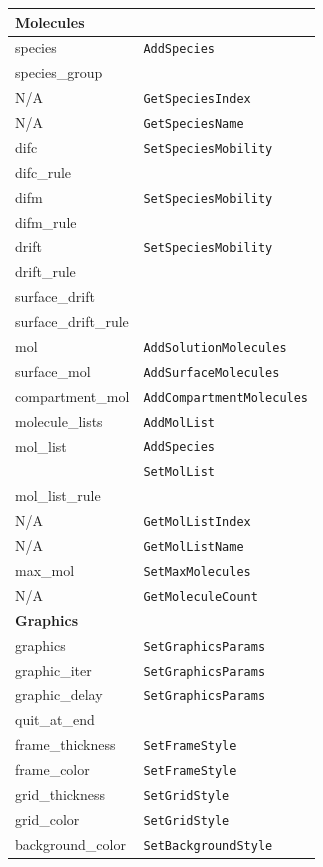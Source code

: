 \documentclass {book}
\newcommand {\ttt} {\texttt}
\begin{document}
\begin{longtable}[c]{ll}
\hline
\multicolumn{2}{l}{\hspace{0.3in}\textbf{Molecules}}\\
\hline
species & \ttt{AddSpecies}\\
species\_group\\ %
N/A & \ttt{GetSpeciesIndex}\\
N/A & \ttt{GetSpeciesName}\\
difc & \ttt{SetSpeciesMobility}\\
difc\_rule \\ %
difm & \ttt{SetSpeciesMobility}\\
difm\_rule & \\ %
drift & \ttt{SetSpeciesMobility}\\
drift\_rule \\ %
surface\_drift \\ %
surface\_drift\_rule \\ %
mol & \ttt{AddSolutionMolecules}\\
surface\_mol & \ttt{AddSurfaceMolecules}\\
compartment\_mol & \ttt{AddCompartmentMolecules}\\
molecule\_lists & \ttt{AddMolList}\\
mol\_list & \ttt{AddSpecies}\\
& \ttt{SetMolList}\\
mol\_list\_rule \\ %
N/A & \ttt{GetMolListIndex}\\
N/A & \ttt{GetMolListName}\\
max\_mol & \ttt{SetMaxMolecules}\\
N/A & \ttt{GetMoleculeCount}\\
\hline
\multicolumn{2}{l}{\hspace{0.3in}\textbf{Graphics}}\\
\hline
graphics & \ttt{SetGraphicsParams}\\
graphic\_iter & \ttt{SetGraphicsParams}\\
graphic\_delay & \ttt{SetGraphicsParams}\\
quit\_at\_end \\ %
frame\_thickness & \ttt{SetFrameStyle}\\
frame\_color & \ttt{SetFrameStyle}\\
grid\_thickness & \ttt{SetGridStyle}\\
grid\_color & \ttt{SetGridStyle}\\
background\_color & \ttt{SetBackgroundStyle}\\

\end{longtable}
\end{document}
